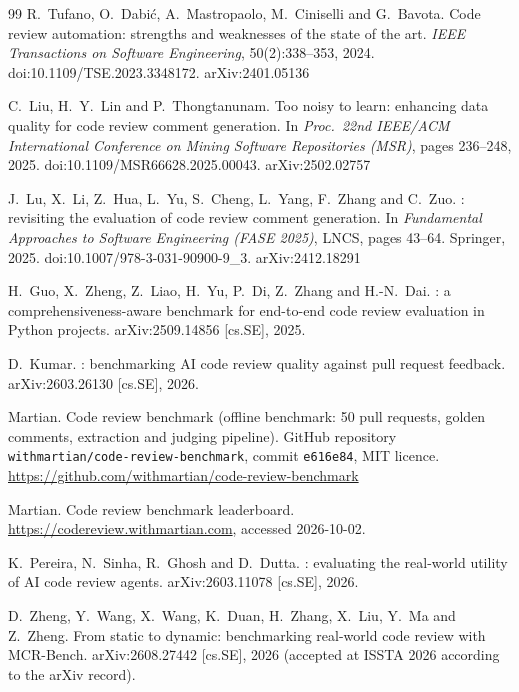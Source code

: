 \documentclass[11pt,a4paper]{article}
\newcommand{\code}[1]{\texttt{#1}}
\begin{document}
\begin{thebibliography}{99}
R.~Tufano, O.~Dabi\'c, A.~Mastropaolo, M.~Ciniselli and G.~Bavota.
\newblock Code review automation: strengths and weaknesses of the state of
the art.
\newblock \emph{IEEE Transactions on Software Engineering}, 50(2):338--353,
2024.
\newblock doi:10.1109/TSE.2023.3348172. arXiv:2401.05136

C.~Liu, H.~Y.~Lin and P.~Thongtanunam.
\newblock Too noisy to learn: enhancing data quality for code review comment
generation.
\newblock In \emph{Proc.\ 22nd IEEE/ACM International Conference on Mining
Software Repositories (MSR)}, pages 236--248, 2025.
\newblock doi:10.1109/MSR66628.2025.00043. arXiv:2502.02757

J.~Lu, X.~Li, Z.~Hua, L.~Yu, S.~Cheng, L.~Yang, F.~Zhang and C.~Zuo.
: revisiting the evaluation of code review comment
generation.
\newblock In \emph{Fundamental Approaches to Software Engineering (FASE
2025)}, LNCS, pages 43--64. Springer, 2025.
\newblock doi:10.1007/978-3-031-90900-9\_3. arXiv:2412.18291

H.~Guo, X.~Zheng, Z.~Liao, H.~Yu, P.~Di, Z.~Zhang and H.-N.~Dai.
: a comprehensiveness-aware benchmark for
end-to-end code review evaluation in {P}ython projects.
\newblock arXiv:2509.14856 [cs.SE], 2025.

D.~Kumar.
: benchmarking {AI} code review quality against pull
request feedback.
\newblock arXiv:2603.26130 [cs.SE], 2026.

Martian.
\newblock Code review benchmark (offline benchmark: 50 pull requests, golden
comments, extraction and judging pipeline).
\newblock GitHub repository \code{withmartian/code-review-benchmark}, commit
\code{e616e84}, MIT licence.
\newblock \url{https://github.com/withmartian/code-review-benchmark}

Martian.
\newblock Code review benchmark leaderboard.
\newblock \url{https://codereview.withmartian.com}, accessed 2026-10-02.

K.~Pereira, N.~Sinha, R.~Ghosh and D.~Dutta.
: evaluating the real-world utility of {AI} code review
agents.
\newblock arXiv:2603.11078 [cs.SE], 2026.

D.~Zheng, Y.~Wang, X.~Wang, K.~Duan, H.~Zhang, X.~Liu, Y.~Ma and Z.~Zheng.
\newblock From static to dynamic: benchmarking real-world code review with
{MCR-Bench}.
\newblock arXiv:2608.27442 [cs.SE], 2026 (accepted at ISSTA 2026 according to
the arXiv record).


\end{thebibliography}
\end{document}
